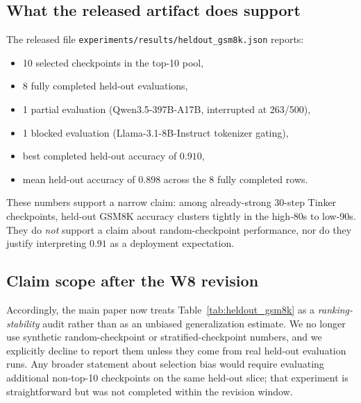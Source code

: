 \subsection{What the released artifact does support}

The released file \texttt{experiments/results/heldout\_gsm8k.json} reports:
\begin{itemize}[leftmargin=1.2em,itemsep=1pt]
  \item 10 selected checkpoints in the top-10 pool,
  \item 8 fully completed held-out evaluations,
  \item 1 partial evaluation (Qwen3.5-397B-A17B, interrupted at 263/500),
  \item 1 blocked evaluation (Llama-3.1-8B-Instruct tokenizer gating),
  \item best completed held-out accuracy of $0.910$,
  \item mean held-out accuracy of $0.898$ across the 8 fully completed rows.
\end{itemize}
These numbers support a narrow claim: among already-strong 30-step Tinker
checkpoints, held-out GSM8K accuracy clusters tightly in the high-80s to
low-90s. They do \emph{not} support a claim about random-checkpoint
performance, nor do they justify interpreting $0.91$ as a deployment
expectation.

\subsection{Claim scope after the W8 revision}

Accordingly, the main paper now treats Table~\ref{tab:heldout_gsm8k} as a
\emph{ranking-stability} audit rather than as an unbiased generalization
estimate. We no longer use synthetic random-checkpoint or stratified-checkpoint
numbers, and we explicitly decline to report them unless they come from real
held-out evaluation runs. Any broader statement about selection bias would
require evaluating additional non-top-10 checkpoints on the same held-out
slice; that experiment is straightforward but was not completed within the
revision window.
